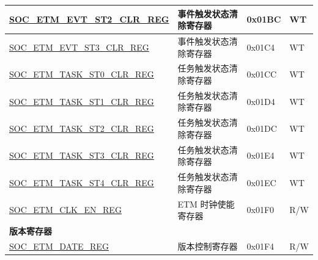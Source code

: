 \begin{longtable}{ | p{6cm} | p{6.2cm} | p{1.3cm} | p{2cm} | }
\hyperref[regdesc:SOCETMEVTST2CLRREG]{SOC\_ETM\_EVT\_ST2\_CLR\_REG} & 事件触发状态清除寄存器 & 0x01BC & WT \\ \hline
\hyperref[regdesc:SOCETMEVTST3CLRREG]{SOC\_ETM\_EVT\_ST3\_CLR\_REG} & 事件触发状态清除寄存器 & 0x01C4 & WT \\ \hline
\hyperref[regdesc:SOCETMTASKST0CLRREG]{SOC\_ETM\_TASK\_ST0\_CLR\_REG} & 任务触发状态清除寄存器 & 0x01CC & WT \\ \hline
\hyperref[regdesc:SOCETMTASKST1CLRREG]{SOC\_ETM\_TASK\_ST1\_CLR\_REG} & 任务触发状态清除寄存器 & 0x01D4 & WT \\ \hline
\hyperref[regdesc:SOCETMTASKST2CLRREG]{SOC\_ETM\_TASK\_ST2\_CLR\_REG} & 任务触发状态清除寄存器 & 0x01DC & WT \\ \hline
\hyperref[regdesc:SOCETMTASKST3CLRREG]{SOC\_ETM\_TASK\_ST3\_CLR\_REG} & 任务触发状态清除寄存器 & 0x01E4 & WT \\ \hline
\hyperref[regdesc:SOCETMTASKST4CLRREG]{SOC\_ETM\_TASK\_ST4\_CLR\_REG} & 任务触发状态清除寄存器 & 0x01EC & WT \\ \hline
\hyperref[regdesc:SOCETMCLKENREG]{SOC\_ETM\_CLK\_EN\_REG} & ETM 时钟使能寄存器 & 0x01F0 & R/W \\ \hline
\multicolumn{4}{|l|}{\textbf{版本寄存器}} \\ \hline
\hyperref[regdesc:SOCETMDATEREG]{SOC\_ETM\_DATE\_REG} & 版本控制寄存器 & 0x01F4 & R/W \\ \hline
\end{longtable}
